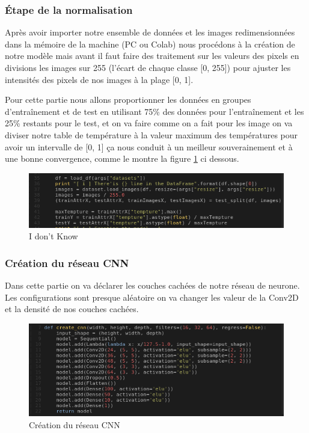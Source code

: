 \documentclass[12pt]{article}
\begin{document}
\subsubsection*{\' Etape de la normalisation}
Après avoir importer notre ensemble de données et les images redimensionnées dans la mémoire de la machine (PC ou Colab) nous procédons à la création de notre modèle mais avant il faut faire des traitement sur les valeurs des pixels en divisions les images sur 255 (l’écart de chaque classe [0, 255]) pour ajuster les intensités des pixels de nos images à la plage [0, 1].

Pour cette partie nous allons proportionner les données en groupes d’entraînement et de test en utilisant 75\% des données pour l’entraînement et les 25\% restants pour le test, et on va faire comme on a fait pour les image on va diviser notre table de température à la valeur maximum des températures pour avoir un intervalle de [0, 1] ça nous conduit à un meilleur souverainement et à une bonne convergence, comme le montre la figure \ref{fig:73} ci dessous.

\begin{figure}[h]
	\centering
	\includegraphics[width=15cm]{img-Chapiter-4/pretraitementimage.png}
	\caption{I don't Know}
	\label{fig:73}
\end{figure}

\subsubsection*{Création du réseau CNN}
Dans cette partie on va déclarer les couches cachées de notre réseau de neurone. Les configurations sont presque aléatoire on va changer les valeur de la Conv2D et la densité de nos couches cachées.

\begin{figure}[h]
	\centering
	\includegraphics[width=15cm]{img-Chapiter-4/createcnn.png}
	\caption{Création du réseau CNN}
\end{figure}
\end{document}

